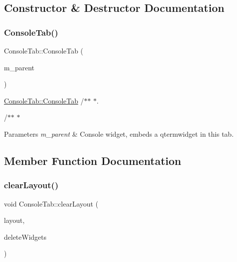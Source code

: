 \subsection{Constructor \& Destructor Documentation}
\mbox{\label{classConsoleTab_a2c631d14f9fe5957e0622e10269e5115}} 
\subsubsection{\texorpdfstring{Console\+Tab()}{ConsoleTab()}}
{\footnotesize\ttfamily Console\+Tab\+::\+Console\+Tab (\begin{DoxyParamCaption}\item[{Q\+Widget $\ast$}]{m\+\_\+parent }\end{DoxyParamCaption})}



\hyperlink{classConsoleTab_a2c631d14f9fe5957e0622e10269e5115}{Console\+Tab\+::\+Console\+Tab} /$\ast$$\ast$ $\ast$. 

/$\ast$$\ast$ $\ast$ 
\begin{DoxyParams}{Parameters}
{\em m\+\_\+parent} & Console widget, embeds a qtermwidget in this tab. \\
\hline
\end{DoxyParams}


\subsection{Member Function Documentation}
\mbox{\label{classConsoleTab_aae70e23b23e401b219edefcac4882eaf}} 
\subsubsection{\texorpdfstring{clear\+Layout()}{clearLayout()}}
{\footnotesize\ttfamily void Console\+Tab\+::clear\+Layout (\begin{DoxyParamCaption}\item[{Q\+Layout $\ast$}]{layout,  }\item[{bool}]{delete\+Widgets }\end{DoxyParamCaption})}



